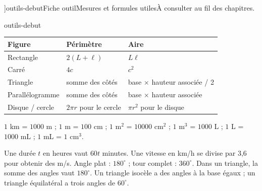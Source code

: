 \editionPage[\pdfbookmark[0]{Fiches outils}{bm-outils-debut-parent}]{outils-debut}{Fiche outil}{Mesures et formules utiles}{À consulter au fil des chapitres.}
\begin{blocEdition}{outils-debut}

\begin{tabularx}{\linewidth}{@{}lYY@{}}\toprule
Figure & Périmètre & Aire\\\midrule
Rectangle & $2(L+\ell)$ & $L\ell$\\[2mm]
Carré & $4c$ & $c^2$\\[2mm]
Triangle & somme des côtés & base $\times$ hauteur associée / 2\\[2mm]
Parallélogramme & somme des côtés & base $\times$ hauteur associée\\[2mm]
Disque / cercle & $2\pi r$ pour le cercle & $\pi r^2$ pour le disque\\\bottomrule
\end{tabularx}
$1$ km = $1000$ m ; $1$ m = $100$ cm ; $1$ m$^2$ = $10000$ cm$^2$ ;
$1$ m$^3$ = $1000$ L ; $1$ L = $1000$ mL ; $1$ mL = $1$ cm$^3$.\par\medskip
Une durée $t$ en heures vaut $60t$ minutes. Une vitesse en km/h se
divise par 3,6 pour obtenir des m/s.
Angle plat : $180^\circ$ ; tour complet : $360^\circ$.
Dans un triangle, la somme des angles vaut $180^\circ$.
Un triangle isocèle a des angles à la base égaux ; un triangle
équilatéral a trois angles de $60^\circ$.

\end{blocEdition}
